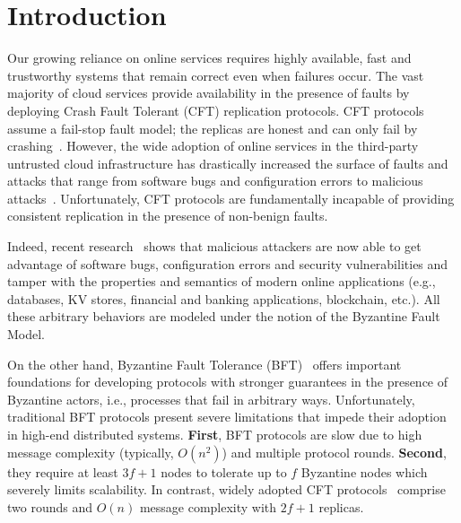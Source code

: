 \section{Introduction}
\label{sec:introduction}
Our growing reliance on online services requires highly available, fast and trustworthy systems that remain correct even when failures occur. The vast majority of cloud services provide availability in the presence of faults by deploying Crash Fault Tolerant (CFT)  replication protocols. CFT protocols assume a fail-stop fault
model; the replicas are honest and can only fail by crashing~\cite{delporte}. However, the wide adoption of online services in the third-party untrusted cloud infrastructure has drastically increased the surface of faults and attacks that range from software bugs and configuration errors to malicious attacks~\cite{Gunawi_bugs-in-the-cloud, Shinde2016,hahnel2017high}. Unfortunately, CFT protocols are fundamentally incapable of providing consistent replication in the presence of non-benign faults.

Indeed, recent research~\cite{Gunawi_bugs-in-the-cloud, Shinde2016,hahnel2017high} shows that malicious attackers are now able to get advantage of software bugs, configuration errors and security vulnerabilities and tamper with the properties and semantics of modern online applications (e.g., databases, KV stores, financial and banking applications, blockchain, etc.). 
All these arbitrary behaviors are modeled under the notion of the Byzantine Fault Model. 
\fi

On the other hand, Byzantine Fault Tolerance (BFT)~\cite{Lamport:1982} offers important foundations for developing protocols with stronger guarantees in the presence of Byzantine actors, i.e., processes that fail in arbitrary ways. %
Unfortunately, traditional BFT protocols present severe limitations that impede their adoption in high-end distributed systems.
{\bf First}, BFT protocols are slow due to high message complexity (typically, $O(n^2)$) and multiple protocol rounds. {\bf Second}, they require at least $3f+1$ nodes to tolerate up to $f$ Byzantine nodes which severely limits scalability. In contrast, widely adopted CFT protocols~\cite{raft, Reed2008AST, primary-backup, engraft} comprise two rounds and $O(n)$ message complexity with $2f+1$ replicas.%

